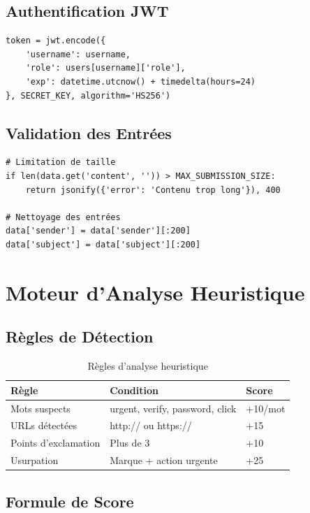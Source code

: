 \documentclass[12pt,a4paper]{article}
\begin{document}
\subsection{Authentification JWT}

\begin{lstlisting}[caption=Génération de token JWT]
token = jwt.encode({
    'username': username,
    'role': users[username]['role'],
    'exp': datetime.utcnow() + timedelta(hours=24)
}, SECRET_KEY, algorithm='HS256')
\end{lstlisting}

\subsection{Validation des Entrées}

\begin{lstlisting}[caption=Validation stricte]
# Limitation de taille
if len(data.get('content', '')) > MAX_SUBMISSION_SIZE:
    return jsonify({'error': 'Contenu trop long'}), 400

# Nettoyage des entrées
data['sender'] = data['sender'][:200]
data['subject'] = data['subject'][:200]
\end{lstlisting}

\section{Moteur d'Analyse Heuristique}

\subsection{Règles de Détection}

\begin{table}[H]
\centering
\begin{tabular}{|l|l|l|}
\hline
\textbf{Règle} & \textbf{Condition} & \textbf{Score} \\
\hline
Mots suspects & urgent, verify, password, click & +10/mot \\
URLs détectées & http:// ou https:// & +15 \\
Points d'exclamation & Plus de 3 & +10 \\
Usurpation & Marque + action urgente & +25 \\
\hline
\end{tabular}
\caption{Règles d'analyse heuristique}
\end{table}

\subsection{Formule de Score}
\end{document}
